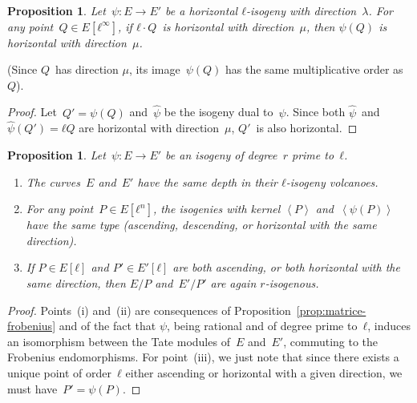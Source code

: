 \documentclass{lms}
\newtheorem{prop}[thm]{Proposition}
\def\chev#1{\left\langle#1\right\rangle}
\begin{document}
\begin{prop}\label{prop:push-horizontal}
Let~$ψ: E → E'$ be a horizontal $ℓ$-isogeny with direction~$λ$.
For any point~$Q ∈ E[ℓ^∞]$,
if $ℓ · Q$~is horizontal with direction~$μ$,
then $ψ(Q)$ is horizontal with direction~$μ$.
\end{prop}
(Since $Q$~has direction $μ$,
its image~$ψ(Q)$ has the same multiplicative order as~$Q$).
\begin{proof}
Let~$Q' = ψ(Q)$ and~$\widehat{ψ}$ be the isogeny dual to~$ψ$.
Since both $\widehat{ψ}$~and~$\widehat{ψ}(Q') = ℓ Q$ are horizontal
with direction~$μ$, $Q'$~is also horizontal.
\end{proof}
\begin{prop}\label{prop:parallel}
Let~$ψ: E → E'$ be an isogeny of degree~$r$ prime to~$ℓ$.
\begin{enumerate}
\item The curves~$E$ and~$E'$ have the same depth
in their $ℓ$-isogeny volcanoes.
\item For any point~$P ∈ E[ℓ^n]$,
the isogenies with kernel $\chev{P}$ and~$\chev{ψ(P)}$ have the same type
(ascending, descending, or horizontal with the same direction).
\item If $P ∈ E[ℓ]$ and $P' ∈ E'[ℓ]$ are both ascending,
or both horizontal with the same direction,
then $E/P$ and~$E'/P'$ are again $r$-isogenous.
\end{enumerate}
\end{prop}
\begin{proof}
Points~(i) and~(ii) are consequences of Proposition~\ref{prop:matrice-frobenius}
and of the fact that $ψ$, being rational and of degree prime to~$ℓ$,
induces an isomorphism between the Tate modules of~$E$ and~$E'$,
commuting to the Frobenius endomorphisms.
For point~(iii), we just note that
since there exists a unique point of order~$ℓ$
either ascending or horizontal with a given direction,
we must have~$P' = ψ(P)$.
\end{proof}

\end{document}
